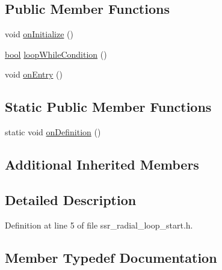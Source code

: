 \subsection*{Public Member Functions}
\begin{DoxyCompactItemize}
\item 
void \hyperlink{structsm__dance__bot_1_1radial__motion__states_1_1SsrRadialLoopStart_a8e6b47039912368560ade062a768d23d}{on\+Initialize} ()
\item 
\hyperlink{classbool}{bool} \hyperlink{structsm__dance__bot_1_1radial__motion__states_1_1SsrRadialLoopStart_a3b57e081f4062b6fc29f12290ea90925}{loop\+While\+Condition} ()
\item 
void \hyperlink{structsm__dance__bot_1_1radial__motion__states_1_1SsrRadialLoopStart_ac2f0bd103a78b1ced21f6f6ce0f645d1}{on\+Entry} ()
\end{DoxyCompactItemize}
\subsection*{Static Public Member Functions}
\begin{DoxyCompactItemize}
\item 
static void \hyperlink{structsm__dance__bot_1_1radial__motion__states_1_1SsrRadialLoopStart_a3cfcd11b20e01832e5cb256ee899c99a}{on\+Definition} ()
\end{DoxyCompactItemize}
\subsection*{Additional Inherited Members}


\subsection{Detailed Description}


Definition at line 5 of file ssr\+\_\+radial\+\_\+loop\+\_\+start.\+h.



\subsection{Member Typedef Documentation}
